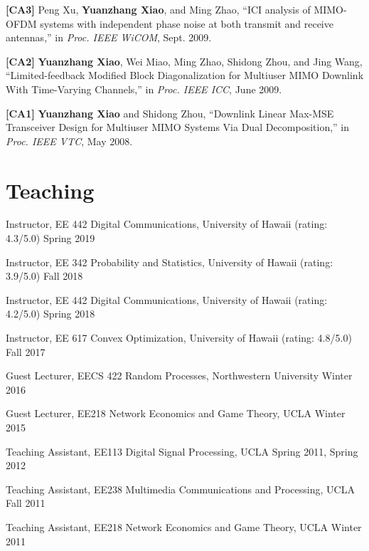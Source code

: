 \documentclass[margin,line]{res}
\begin{document}
\begin{resume}
\textbf{[CA3]} Peng Xu, {\bf Yuanzhang Xiao}, and Ming Zhao, ``ICI analysis of MIMO-OFDM systems with independent phase noise at both transmit and
receive antennas,'' in \emph{Proc. IEEE WiCOM}, Sept. 2009.

\textbf{[CA2]} {\bf Yuanzhang Xiao}, Wei Miao, Ming Zhao, Shidong Zhou, and Jing Wang, ``Limited-feedback Modified Block Diagonalization for
Multiuser MIMO Downlink With Time-Varying Channels,'' in \emph{Proc. IEEE ICC}, June 2009.

\textbf{[CA1]} {\bf Yuanzhang Xiao} and Shidong Zhou, ``Downlink Linear Max-MSE Transceiver Design for Multiuser MIMO Systems Via Dual
Decomposition,'' in \emph{Proc. IEEE VTC}, May 2008.


\section{\sc Teaching}

Instructor, EE 442 Digital Communications, University of Hawaii (rating: 4.3/5.0) \hfill Spring 2019

\vspace{-.3cm} Instructor, EE 342 Probability and Statistics, University of Hawaii (rating: 3.9/5.0) \hfill Fall 2018

\vspace{-.3cm} Instructor, EE 442 Digital Communications, University of Hawaii (rating: 4.2/5.0) \hfill Spring 2018

\vspace{-.3cm} Instructor, EE 617 Convex Optimization, University of Hawaii (rating: 4.8/5.0) \hfill Fall 2017

\vspace{-.3cm} Guest Lecturer, EECS 422 Random Processes, Northwestern University \hfill Winter 2016

\vspace{-.3cm} Guest Lecturer, EE218 Network Economics and Game Theory, UCLA \hfill Winter 2015

\vspace{-.3cm} Teaching Assistant, EE113 Digital Signal Processing, UCLA \hfill Spring 2011, Spring 2012

\vspace{-.3cm} Teaching Assistant, EE238 Multimedia Communications and Processing, UCLA \hfill Fall 2011

\vspace{-.3cm} Teaching Assistant, EE218 Network Economics and Game Theory, UCLA \hfill Winter 2011




\end{resume}
\end{document}
